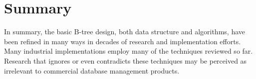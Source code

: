 \hypertarget{summary}{%
\section{Summary}\label{summary}}

In summary, the basic B-tree design, both data structure and algorithms,
have been refined in many ways in decades of research and implementation
efforts. Many industrial implementations employ many of the techniques
reviewed so far. Research that ignores or even contradicts these
techniques may be perceived as irrelevant to commercial database
management products.

